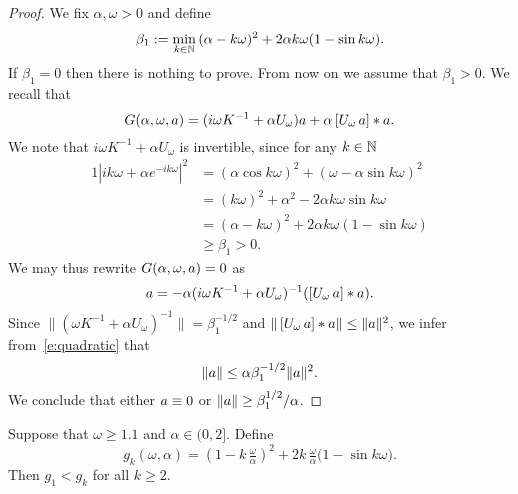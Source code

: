 \begin{proof}
We fix $\alpha,\omega>0$ and define 
\[
  \beta_1 := \min_{k \in \mathbb{N}} \, (\alpha-k\omega)^2 + 2 \alpha k \omega ( 1- \sin k \omega ).
\]
If $\beta_1=0$ then there is nothing to prove. From now on we assume that $\beta_1>0$. 
We recall that 
\[ G(\alpha,\omega,a) = (i \omega K^{-1} + \alpha U_{\omega}) a + \alpha \left[U_\omega \, a \right] * a .
\]
We note that $i \omega K^{-1} + \alpha U_{\omega}$ is invertible, since
for any $k \in \mathbb{N}$
\begin{alignat*}{1}
  |ik\omega + \alpha e^{-i k \omega}|^2
  & =  (\alpha \cos k \omega )^2 + ( \omega - \alpha \sin  k \omega )^2  \\
  &  = (k \omega)^2 + \alpha^2 - 2 \alpha  k \omega \sin k \omega   \\
&= (\alpha - k\omega)^2 + 2 \alpha k \omega ( 1 - \sin k \omega)  \\
&\geq \beta_1 >0.
\end{alignat*}
We may thus rewrite $G(\alpha,\omega,a) = 0$ as 
\begin{equation}\label{e:quadratic}
 a = - \alpha  (i \omega K^{-1} + \alpha U_{\omega})^{-1} ( \left[U_\omega \, a \right] * a ) .
\end{equation}
Since $\| ( \omega K^{-1} + \alpha U_{\omega})^{-1} \| = \beta_1^{-1/2}$
and $\| \left[U_\omega \, a \right] * a \| \leq \| a \|^2 $,
we infer from~\eqref{e:quadratic} that
\[
  \| a \| \leq  \alpha \beta_1^{-1/2} \|a\|^2.
\]
We conclude that either $a \equiv 0$ or $\| a \| \geq \beta_1^{1/2} /\alpha $.
\end{proof}

\begin{proposition}
	\label{prop:G1Minimizer}
	Suppose that $ \omega \geq 1.1$ and $ \alpha \in (0,2]$. Define 
	\begin{equation}
g_k(\omega,\alpha) =		\left(1-k \,\tfrac{\omega}{\alpha} \right)^2 + 2  k \, \tfrac{\omega}{\alpha} \bigl( 1- \sin k \omega \bigr) .
	\end{equation}
Then $ g_1 <g_k$ for all $ k \geq 2$. 
\end{proposition}

